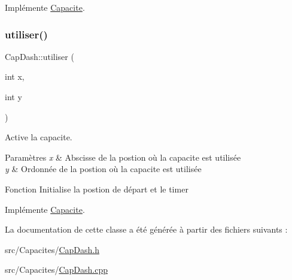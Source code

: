 Implémente \hyperlink{class_capacite_a924214972f385ef409031bafc0f315b7}{Capacite}.

\mbox{\label{class_cap_dash_a82823122659ff5a87a09e9ddf0e3dabb}} 
\subsubsection{\texorpdfstring{utiliser()}{utiliser()}}
{\footnotesize\ttfamily Cap\+Dash\+::utiliser (\begin{DoxyParamCaption}\item[{int}]{x,  }\item[{int}]{y }\end{DoxyParamCaption})\hspace{0.3cm}{\ttfamily [virtual]}}



Active la capacite. 


\begin{DoxyParams}{Paramètres}
{\em x} & Abscisse de la postion où la capacite est utilisée \\
\hline
{\em y} & Ordonnée de la postion où la capacite est utilisée\\
\hline
\end{DoxyParams}
Fonction Initialise la postion de départ et le timer 

Implémente \hyperlink{class_capacite_a6f5e6efda11f80ab8538e23f5bdc6e79}{Capacite}.



La documentation de cette classe a été générée à partir des fichiers suivants \+:\begin{DoxyCompactItemize}
\item 
src/\+Capacites/\hyperlink{_cap_dash_8h}{Cap\+Dash.\+h}\item 
src/\+Capacites/\hyperlink{_cap_dash_8cpp}{Cap\+Dash.\+cpp}\end{DoxyCompactItemize}
